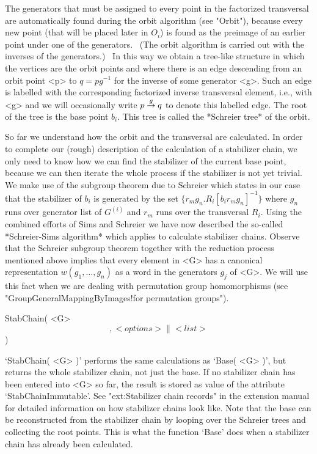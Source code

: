 The generators that  must be assigned  to every  point in the  factorized
transversal are  automatically  found  during the   orbit algorithm  (see
"Orbit"), because every new point (that will be placed later in $O_i$) is
found as the preimage of an earlier point under  one of the generators. \
(The orbit algorithm is carried out with the inverses of the generators.)
\ In this way we obtain  a tree-like structure in  which the vertices are
the  orbit points and where  there  is an edge  descending  from an orbit
point <p> to  $q=pg^{-1}$ for the inverse of  some generator <g>. Such an
edge is labelled with   the corresponding factorized inverse  transversal
element, i.e., with <g> and we will occasionally write $p\labelto g q$ to
denote this labelled edge. The root of the  tree is the base point $b_i$.
This tree is called the *Schreier tree* of the orbit.

So far we understand how the orbit and the transversal are calculated. In
order  to  complete  our  (rough) description  of  the  calculation  of a
stabilizer chain, we only need to know how  we can find the stabilizer of
the current base point, because we can then  iterate the whole process if
the  stabilizer is not yet trivial.  We make use  of the subgroup theorem
due to Schreier which states in our case that  the stabilizer of $b_i$ is
generated by the set $\{  r_mg_n.  R_i[b_i{r_mg_n}]^{-1} \}$ where  $g_n$
runs over generator list of $G^{(i)}$ and $r_m$ runs over the transversal
$R_i$.  Using   the combined efforts of   Sims  and Schreier we  have now
described the so-called *Schreier-Sims algorithm* which {\GAP} applies to
calculate stabilizer chains. Observe  that the Schreier subgroup  theorem
together with the reduction   process mentioned above implies that  every
element in <G> has a canonical representation $w(g_1,  \ldots, g_n)$ as a
word in the  generators $g_j$ of <G>.  We will use  this fact when we are
dealing    with          permutation    group       homomorphisms    (see
"GroupGeneralMappingByImages!for permutation groups").

\>StabChain( <G> \[, <options> \| <list> \] )

`StabChain( <G> )' performs  the same calculations  as `Base( <G> )', but
returns the whole stabilizer  chain, not just  the base.
If no stabilizer chain has been entered into <G> so far, the result is
stored as value of the attribute `StabChainImmutable'.
See "ext:Stabilizer chain records" in the extension manual for detailed
information on how stabilizer chains look like.
Note that the base can be reconstructed from the stabilizer chain by
looping over the Schreier trees and collecting the root points.
This is what the function `Base' does when a stabilizer chain has already
been calculated.

